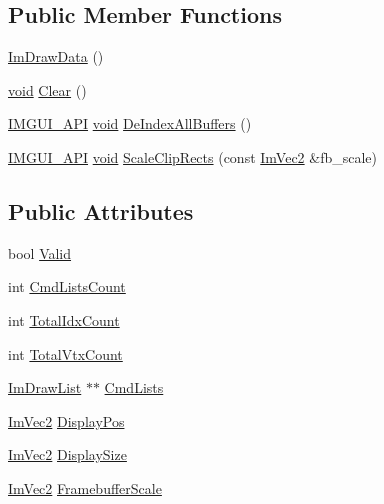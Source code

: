 \subsection*{Public Member Functions}
\begin{DoxyCompactItemize}
\item 
\hyperlink{structImDrawData_a96b50c40107c997e9eea7ac3ba1a6138}{Im\+Draw\+Data} ()
\item 
\hyperlink{imgui__impl__opengl3__loader_8h_ac668e7cffd9e2e9cfee428b9b2f34fa7}{void} \hyperlink{structImDrawData_ab6a90612bd22eaff0d42539875e2e5c9}{Clear} ()
\item 
\hyperlink{imgui_8h_a43829975e84e45d1149597467a14bbf5}{I\+M\+G\+U\+I\+\_\+\+A\+PI} \hyperlink{imgui__impl__opengl3__loader_8h_ac668e7cffd9e2e9cfee428b9b2f34fa7}{void} \hyperlink{structImDrawData_a88ae746e958b79ee527fe94dee29d57c}{De\+Index\+All\+Buffers} ()
\item 
\hyperlink{imgui_8h_a43829975e84e45d1149597467a14bbf5}{I\+M\+G\+U\+I\+\_\+\+A\+PI} \hyperlink{imgui__impl__opengl3__loader_8h_ac668e7cffd9e2e9cfee428b9b2f34fa7}{void} \hyperlink{structImDrawData_a951fbe824674c7a5c2f6a478f3654ca8}{Scale\+Clip\+Rects} (const \hyperlink{structImVec2}{Im\+Vec2} \&fb\+\_\+scale)
\end{DoxyCompactItemize}
\subsection*{Public Attributes}
\begin{DoxyCompactItemize}
\item 
bool \hyperlink{structImDrawData_ad01ab9ce5e8843b7860ccbb3eb9a6554}{Valid}
\item 
int \hyperlink{structImDrawData_adc0bbc2881c15f78bdabe51d82582f4e}{Cmd\+Lists\+Count}
\item 
int \hyperlink{structImDrawData_a1ac8a5d441f464628295ef91a0602fc5}{Total\+Idx\+Count}
\item 
int \hyperlink{structImDrawData_af0035b52cdf91932b25eaf2da853965a}{Total\+Vtx\+Count}
\item 
\hyperlink{structImDrawList}{Im\+Draw\+List} $\ast$$\ast$ \hyperlink{structImDrawData_a9e93fe7e620eb2e9f61e3b689d617edc}{Cmd\+Lists}
\item 
\hyperlink{structImVec2}{Im\+Vec2} \hyperlink{structImDrawData_a1e7755e98f5e24b1f4d9152766e6346e}{Display\+Pos}
\item 
\hyperlink{structImVec2}{Im\+Vec2} \hyperlink{structImDrawData_a74d53447c8882a3ce6dc7aaa3e081f39}{Display\+Size}
\item 
\hyperlink{structImVec2}{Im\+Vec2} \hyperlink{structImDrawData_ad57d704d2e5aecd79454c98c8a8111ec}{Framebuffer\+Scale}
\end{DoxyCompactItemize}


